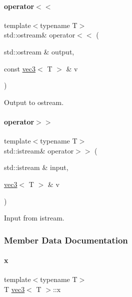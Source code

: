 \mbox{\label{structvec3_af5e1bcad9d3d484d6f4e6b3f8949f5cf}} 
\paragraph{\texorpdfstring{operator$<$$<$}{operator<<}}
{\footnotesize\ttfamily template$<$typename T$>$ \\
std\+::ostream\& operator$<$$<$ (\begin{DoxyParamCaption}\item[{std\+::ostream \&}]{output,  }\item[{const \mbox{\hyperlink{structvec3}{vec3}}$<$ T $>$ \&}]{v }\end{DoxyParamCaption})\hspace{0.3cm}{\ttfamily [friend]}}



Output to ostream. 

\mbox{\label{structvec3_a72f92578884bd68e0747871acd8545fd}} 
\paragraph{\texorpdfstring{operator$>$$>$}{operator>>}}
{\footnotesize\ttfamily template$<$typename T$>$ \\
std\+::istream\& operator$>$$>$ (\begin{DoxyParamCaption}\item[{std\+::istream \&}]{input,  }\item[{\mbox{\hyperlink{structvec3}{vec3}}$<$ T $>$ \&}]{v }\end{DoxyParamCaption})\hspace{0.3cm}{\ttfamily [friend]}}



Input from istream. 



\subsubsection{Member Data Documentation}
\mbox{\label{structvec3_a3f1f0c60e13b8bf67f64b1afc9cd6d1a}} 
\paragraph{\texorpdfstring{x}{x}}
{\footnotesize\ttfamily template$<$typename T$>$ \\
T \mbox{\hyperlink{structvec3}{vec3}}$<$ T $>$\+::x}

